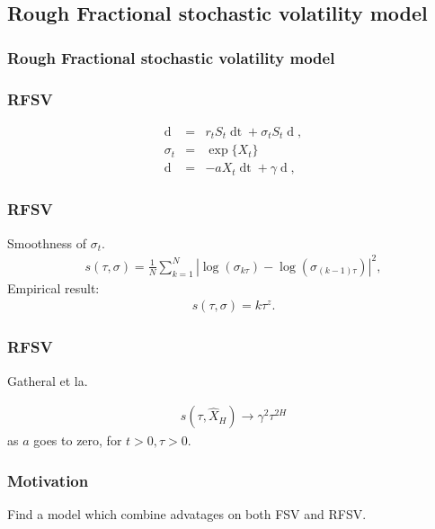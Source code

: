 \documentclass[]{beamer}
\begin{document}
\subsection{Rough Fractional stochastic volatility model}
\frametitle{Rough Fractional stochastic volatility model}
\begin{frame}
  \frametitle{RFSV}
\begin{eqnarray*}
  \mathop{dS_t} &=& r_tS_t\mathop{dt} + \sigma_t S_t \mathop{dB_t},\\
  \sigma_t &=& \exp\{X_t\} \nonumber\\
  \mathop{dX_t} &=&  -a X_t \mathop{dt} + \gamma \mathop{dU_H(t)},
\end{eqnarray*}
\end{frame}
\begin{frame}
  \frametitle{RFSV}
  Smoothness of $\sigma_t$.
  \begin{eqnarray*}
  s(\tau, \sigma) = \frac{1}{N}\sum\limits_{k=1}^N|\log(\sigma_{k\tau}) - \log(\sigma_{(k-1)\tau})|^2,
  \label{sec:smo}
\end{eqnarray*}
Empirical result:
\begin{eqnarray*}
  s(\tau, \sigma) =  k\tau^z.
  \label{sec:smth}
\end{eqnarray*}

\end{frame}


\begin{frame}
  \frametitle{RFSV}
  Gatheral et la.\cite{Gatheral}
\begin{theorem}
  \begin{eqnarray*}
	s(\tau, \hat{X}_{H}) \rightarrow \gamma^2\tau^{2H}
	\label{sec:rfsv}
  \end{eqnarray*}
 as $a$ goes to zero, for $t>0, \tau>0$.
\end{theorem}
\end{frame}

\begin{frame}
\frametitle{Motivation}
  Find a model which combine advatages on both FSV and RFSV.
\end{frame}
\end{document}
